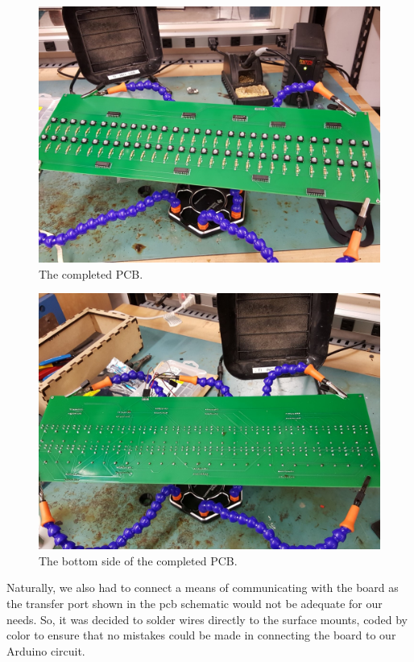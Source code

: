 \begin{figure}[h!]
  \centering
  \includegraphics[width=\linewidth]{image/completedpcb.jpg}
  \caption{The completed PCB.}
\end{figure}

\begin{figure}[h!]
  \centering
  \includegraphics[width=\linewidth]{image/bottomofpcb.jpg}
  \caption{The bottom side of the completed PCB.}
\end{figure}

Naturally, we also had to connect a means of communicating with the board as the transfer
port shown in the pcb schematic would not be adequate for our needs. So, it was decided to
solder wires directly to the surface mounts, coded by color to ensure that no mistakes
could be made in connecting the board to our Arduino circuit.

